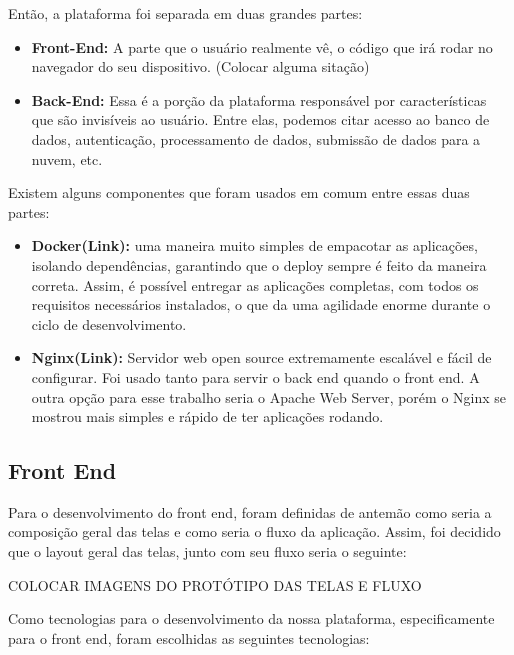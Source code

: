 \documentclass[11pt,twoside]{article}
\begin{document}
Então, a plataforma foi separada em duas grandes partes:

\begin{itemize}
  \item \textbf{Front-End:} A parte que o usuário realmente vê, o código que irá rodar no navegador do seu dispositivo. (Colocar alguma sitação)
  \item \textbf{Back-End:} Essa é a porção da plataforma responsável por características que são invisíveis ao usuário. Entre elas, podemos citar acesso ao banco de dados, autenticação, processamento de dados,
  submissão de dados para a nuvem, etc.
\end{itemize}

Existem alguns componentes que foram usados em comum entre essas duas partes:

\begin{itemize}
  \item \textbf{Docker(Link):} uma maneira muito simples de empacotar as aplicações, isolando dependências, garantindo que o deploy sempre é feito da maneira correta. Assim, é possível entregar as aplicações completas, com
  todos os requisitos necessários instalados, o que da uma agilidade enorme durante o ciclo de desenvolvimento.
  \item \textbf{Nginx(Link):} Servidor web open source extremamente escalável e fácil de configurar. Foi usado tanto para servir o back end quando o front end. A outra opção para esse trabalho seria o Apache Web Server, porém
  o Nginx se mostrou mais simples e rápido de ter aplicações rodando.
\end{itemize}

\subsection{Front End}

Para o desenvolvimento do front end, foram definidas de antemão como seria a composição geral das telas e como seria o fluxo da aplicação. Assim, foi decidido que o layout geral das telas, junto com seu
fluxo seria o seguinte:

COLOCAR IMAGENS DO PROTÓTIPO DAS TELAS E FLUXO

Como tecnologias para o desenvolvimento da nossa plataforma, especificamente para o front end, foram escolhidas as seguintes tecnologias:
\end{document}
